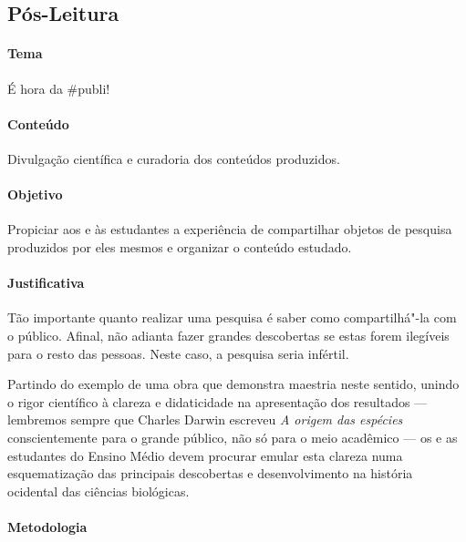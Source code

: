 \documentclass[11pt]{extarticle}
\begin{document}
\subsection{Pós-Leitura}

\paragraph{Tema} É hora da \#publi!

\paragraph{Conteúdo} Divulgação científica e curadoria dos conteúdos produzidos.

\paragraph{Objetivo} Propiciar aos e às estudantes a experiência de 
compartilhar objetos de pesquisa produzidos por eles mesmos e organizar
o conteúdo estudado.

\paragraph{Justificativa} Tão importante quanto realizar uma pesquisa é
saber como compartilhá"-la com o público. Afinal, não adianta fazer grandes
descobertas se estas forem ilegíveis para o resto das pessoas. Neste caso,
a pesquisa seria infértil.

Partindo do exemplo de uma obra que demonstra maestria neste sentido,
unindo o rigor científico à clareza e didaticidade na apresentação
dos resultados --- lembremos sempre que Charles Darwin escreveu \textit{A origem das espécies}
conscientemente para o grande público, não só para o meio acadêmico --- 
os e as estudantes do Ensino Médio devem procurar emular esta clareza
numa esquematização das principais descobertas e desenvolvimento
na história ocidental das ciências biológicas.

\paragraph{Metodologia}
\end{document}
